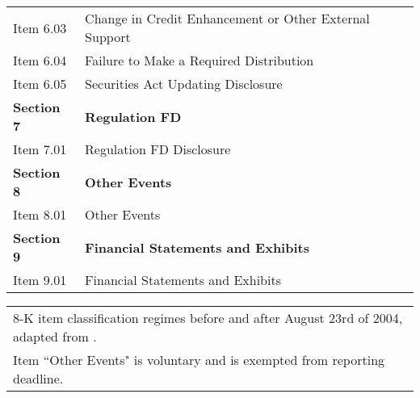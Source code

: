 \begin{table}[H]
\begin{tabular}{ll}
    Item 6.03 & Change in Credit Enhancement or Other External Support \\
    Item 6.04 & Failure to Make a Required Distribution \\
    Item 6.05 & Securities Act Updating Disclosure \\
    \textbf{Section 7} & \textbf{Regulation FD} \\
    Item 7.01 & Regulation FD Disclosure \\
    \textbf{Section 8} & \textbf{Other Events} \\
    Item 8.01 & Other Events \\
    \textbf{Section 9} & \textbf{Financial Statements and Exhibits} \\
    Item 9.01 & Financial Statements and Exhibits \\
    \end{tabular}%

\begin{tabular}{l}
8-K item classification regimes before and after August 23rd of 2004, adapted from \cite{secFinalRuleAdditional2004}. \\
Item ``Other Events" is voluntary %
and is exempted from reporting deadline.
\end{tabular}
\end{table}%
